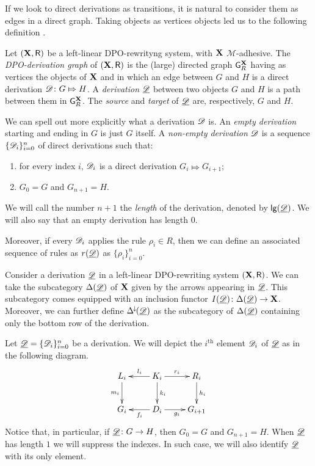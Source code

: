 If we look to direct derivations as transitions, it is natural to consider them as edges in a direct graph. Taking objects as vertices objects led us to the following definition \cite{heindel2009category}.

\begin{definition}
	Let $(\textbf {\textup{X}}, \mathsf{R})$ be a left-linear DPO-rewrityng system, with $\textbf {\textup{X}}$ $\mathcal{M}$-adhesive. The \emph{DPO-derivation graph} of $(\textbf {\textup{X}}, \mathsf{R})$ is the (large)  directed graph $\mathsf{G}^{\textbf {\textup{X}}}_R$ having as vertices the objects of $\textbf {\textup{X}}$ and in which an edge between $G$ and $H$ is a direct derivation $\mathscr{D}\colon G\Mapsto H$.	A \emph{derivation} $\underline{\mathscr{D}}$ between two objects $G$ and $H$ is a path between them in $\mathsf{G}^{\textbf {\textup{X}}}_R$. The \emph{source} and \emph{target} of $\underline{\mathscr{D}}$ are, respectively, $G$ and $H$.
\end{definition}

\begin{remark}
We can spell out more explicitly what  a derivation $\mathscr{D}$ is.  An \emph{empty derivation} starting and ending in $G$ is just $G$ itself.  A \emph{non-empty derivation} $\mathscr{D}$ is a sequence $\{\mathscr{D}_i\}_{i=0}^n$ of direct derivations such that:
\begin{enumerate}
	\item for every index $i$, $\mathscr{D}_i$ is a direct derivation $G_i \Mapsto G_{i+1}$;
	\item $G_0=G$ and $G_{n+1}=H$.
\end{enumerate}

We will call the number $n+1$ the \emph{length} of the derivation, denoted by $\mathsf{lg}(\underline{\mathscr{D}})$. We will also say that an empty derivation has length $0$. 

Moreover,  if every $\mathscr{D}_i$ applies the rule $\rho_i\in R$, then we can define an associated sequence of rules as $r(\underline{\mathscr{D}})$ as $\{\rho_i\}_{i=0}^n$.
\end{remark}

\begin{remark}\label{rem:func}
	Consider a derivation $\underline{\mathscr{D}}$ in a left-linear DPO-rewriting system $(\textbf {\textup{X}}, \mathsf{R})$. We can take the subcategory $\Delta(\underline{\mathscr{D}})$ of $\textbf {\textup{X}}$ given by the arrows appearing in $\underline{\mathscr{D}}$. This subcategory comes equipped with an inclusion functor $I(\underline{\mathscr{D}})\colon \Delta(\underline{\mathscr{D}})\to \textbf {\textup{X}}$. Moreover, we can further define $\Delta^{\hspace{-1pt}\downarrow\hspace{-1pt}}(\underline{\mathscr{D}})$ as the subcategory of $\Delta(\underline{\mathscr{D}})$ containing only the bottom row of the derivation.
\end{remark}
	
\begin{notation}Let $\underline{\mathscr{D}}=\{\mathscr{D}_i\}_{i=0}^n$ be a derivation. We will depict the $i^\text{th}$ element $\mathscr{D}_i$ of $\underline{\mathscr{D}}$ as in the following diagram.  
	\[\xymatrix{L_i \ar[d]_{m_i}& K_i \ar[d]^{k_i}\ar[l]_{l_i} \ar[r]^{r_i} & R_i \ar[d]^{h_i} \\G_{i} & \ar[l]^{f_{i}} D_{i} \ar[r]_{g_{i}}& G_{i+1} }\]
	Notice that, in particular, if $\underline{\mathscr{D}}\colon G\to H$, then $G_0=G$ and $G_{n+1}=H$. When $\underline{\mathscr{D}}$ has length $1$ we will suppress the indexes. In such case, we will also identify $\underline{\mathscr{D}}$ with its only element. 
\end{notation} 

